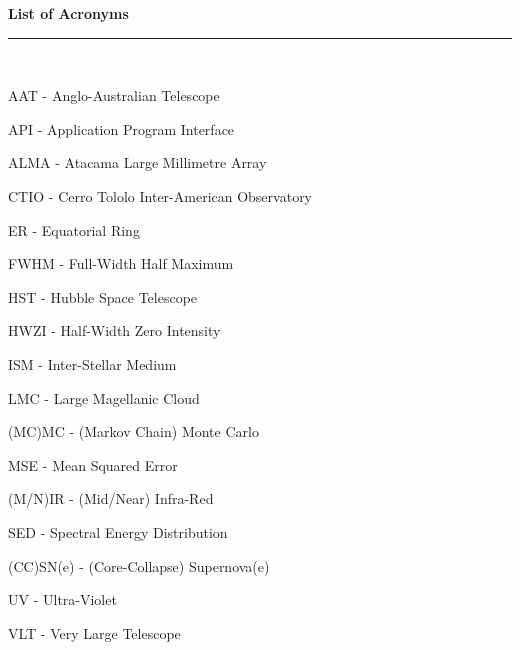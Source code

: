 \thispagestyle{empty}
\begin{raggedleft}
\vspace*{23mm}
\hfill {\huge {\bf {List of Acronyms}}} \\
\vspace{6mm}
\hfill \rule{4in}{.015in} \\
\vspace{19mm}
\end{raggedleft}




%
%

AAT - Anglo-Australian Telescope

API - Application Program Interface

ALMA - Atacama Large Millimetre Array

CTIO - Cerro Tololo Inter-American Observatory

ER - Equatorial Ring

FWHM - Full-Width Half Maximum

HST - Hubble Space Telescope

HWZI - Half-Width Zero Intensity

ISM - Inter-Stellar Medium

LMC - Large Magellanic Cloud

(MC)MC - (Markov Chain) Monte Carlo

MSE - Mean Squared Error

(M/N)IR - (Mid/Near) Infra-Red 

SED - Spectral Energy Distribution

(CC)SN(e) - (Core-Collapse) Supernova(e)

UV - Ultra-Violet

VLT - Very Large Telescope
